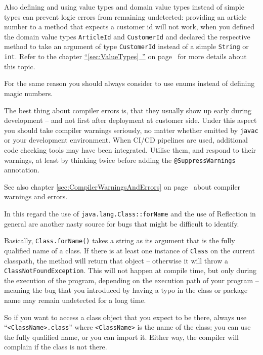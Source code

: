 \documentclass[11pt,a4paper, titlepage, parskip=half, headsepline, footsepline, cleardoublepage=current, headheight=1cm]{scrbook}
\newcommand*{\tqfullvref}[1]{\hyperref[{#1}]{“\ref*{#1}~\nameref*{#1}”} on page~\pageref{#1}}
\newcommand*{\tqvref}[1]{\hyperref[{#1}]{\ref*{#1}} on page~\pageref{#1}}
\begin{document}
Also defining and using value types and domain value types instead of simple types can prevent logic errors from remaining undetected: providing an article number to a method that expects a customer id will not work, when you defined the domain value types \lstinline|ArticleId| and \lstinline|CustomerId| and declared the respective method to take an argument of type \lstinline|CustomerId| instead of a simple \lstinline|String| or \lstinline|int|. Refer to the chapter \tqfullvref{sec:ValueTypes} for more details about this topic.

For the same reason you should always consider to use enums instead of defining magic numbers.

The best thing about compiler errors is, that they usually show up early during development – and not first after deployment at customer side. Under this aspect you should take compiler warnings seriously, no matter whether emitted by \verb#javac# or your development environment. When CI/CD pipelines are used, additional code checking tools may have been integrated. Utilise them, and respond to their warnings, at least by thinking twice before adding the \lstinline|@SuppressWarnings|\autocite{ORACLE_DOC_SUPPRESSWARNINGS_ANNOTATION} annotation.

See also chapter \tqvref{sec:CompilerWarningsAndErrors} about compiler warnings and errors.

In this regard the use of \lstinline|java.lang.Class::forName|\autocite{ORACLE_DOC_CLASS:forName} and the use of Reflection in general are another nasty source for bugs that might be difficult to identify.

Basically, \lstinline|Class.forName()| takes a string as its argument that is the fully qualified name of a class. If there is at least one instance of \lstinline|Class| on the current classpath, the method will return that object – otherwise it will throw a \lstinline|ClassNotFoundException|\autocite{ORACLE_DOC_CLASSNOTFOUNDEXCEPTION_CLASS}. This will not happen at compile time, but only during the execution of the program, depending on the execution path of your program – meaning the bug that you introduced by having a typo in the class or package name may remain undetected for a long time.

So if you want to access a class object that you expect to be there, always use “\lstinline|<ClassName>.class|” where \verb#<ClassName># is the name of the class; you can use the fully qualified name, or you can import it. Either way, the compiler will complain if the class is not there.
\end{document}
